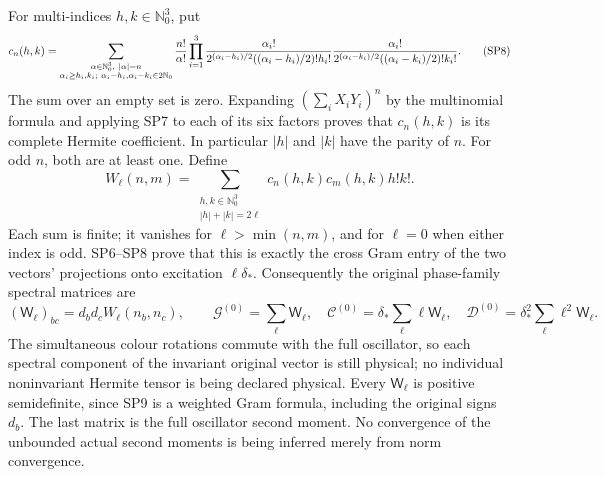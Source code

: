 \documentclass[11pt]{article}
\begin{document}
For multi-indices \(h,k\in\mathbb N_0^3\), put
\[
 c_n(h,k)=
 \sum_{\substack{\alpha\in\mathbb N_0^3,\ |\alpha|=n\\
                 \alpha_i\ge h_i,k_i;\ \alpha_i-h_i,\alpha_i-k_i\in2\mathbb N_0}}
 {n!\over\alpha!}
 \prod_{i=1}^3
 {\alpha_i!\over2^{(\alpha_i-h_i)/2}((\alpha_i-h_i)/2)!h_i!}
 {\alpha_i!\over2^{(\alpha_i-k_i)/2}((\alpha_i-k_i)/2)!k_i!}.
 \tag{SP8}
\]
The sum over an empty set is zero. Expanding \((\sum_iX_iY_i)^n\) by the multinomial formula and applying SP7 to each of its six factors proves that \(c_n(h,k)\) is its complete Hermite coefficient. In particular \(|h|\) and \(|k|\) have the parity of \(n\). For odd \(n\), both are at least one. Define
\[
 W_\ell(n,m)=
 \sum_{\substack{h,k\in\mathbb N_0^3\\ |h|+|k|=2\ell}}
 c_n(h,k)c_m(h,k)h!k! .
 \tag{SP9}
\]
Each sum is finite; it vanishes for \(\ell>\min(n,m)\), and for \(\ell=0\) when either index is odd. SP6–SP8 prove that this is exactly the cross Gram entry of the two vectors' projections onto excitation \(\ell\delta_*\). Consequently the original phase-family spectral matrices are
\[
 (\mathsf W_\ell)_{bc}=d_bd_c W_\ell(n_b,n_c),\qquad
 \mathcal G^{(0)}=\sum_\ell\mathsf W_\ell,\quad
 \mathcal C^{(0)}=\delta_*\sum_\ell\ell\mathsf W_\ell,\quad
 \mathcal D^{(0)}=\delta_*^2\sum_\ell\ell^2\mathsf W_\ell.
 \tag{SP10}
\]
The simultaneous colour rotations commute with the full oscillator, so each spectral component of the invariant original vector is still physical; no individual noninvariant Hermite tensor is being declared physical. Every \(\mathsf W_\ell\) is positive semidefinite, since SP9 is a weighted Gram formula, including the original signs \(d_b\). The last matrix is the full oscillator second moment. No convergence of the unbounded actual second moments is being inferred merely from norm convergence.
\end{document}
